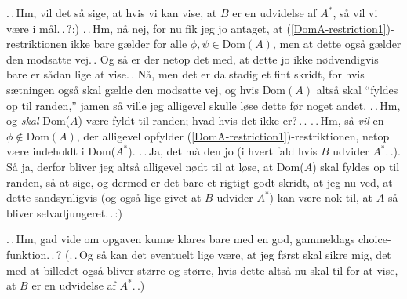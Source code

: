\documentclass{report}
\begin{document}
.\,.\,Hm, vil det så sige, at hvis vi kan vise, at $B$ er en udvidelse af $A^*$, så vil vi være i mål.\,.\,?:) .\,.\,Hm, nå nej, for nu fik jeg jo antaget, at (\ref{DomA-restriction1})-restriktionen ikke bare gælder for alle $\phi,\psi\in\mathrm{Dom}(A)$, men at dette også gælder den modsatte vej.\,. Og så er der netop det med, at dette jo ikke nødvendigvis bare er sådan lige at vise.\,. Nå, men det er da stadig et fint skridt, for hvis sætningen også skal gælde den modsatte vej, og hvis Dom$(A)$ altså skal ``fyldes op til randen,'' jamen så ville jeg alligevel skulle løse dette før noget andet. .\,.\,Hm, og \emph{skal} Dom($A$) være fyldt til randen; hvad hvis det ikke er?\,.\,. .\,.\,Hm, så \emph{vil} en $\phi\notin\mathrm{Dom}(A)$, der alligevel opfylder (\ref{DomA-restriction1})-restriktionen, netop være indeholdt i Dom($A^*$). .\,.\,Ja, det må den jo (i hvert fald hvis $B$ udvider $A^*$.\,.). Så ja, derfor bliver jeg altså alligevel nødt til at løse, at Dom($A$) skal fyldes op til randen, så at sige, og dermed er det bare et rigtigt godt skridt, at jeg nu ved, at dette sandsynligvis (og også lige givet at $B$ udvider $A^*$) kan være nok til, at $A$ så bliver selvadjungeret.\,.\,:) 

.\,.\,Hm, gad vide om opgaven kunne klares bare med en god, gammeldags choice-funktion.\,.\,? (.\,.\,Og så kan det eventuelt lige være, at jeg først skal sikre mig, det med at billedet også bliver større og større, hvis dette altså nu skal til for at vise, at $B$ er en udvidelse af $A^*$.\,.)
\end{document}
